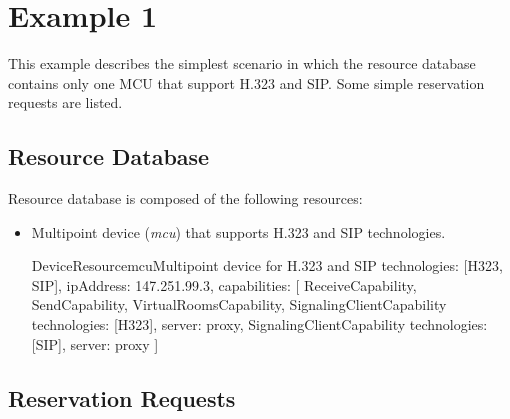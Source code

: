 \section{Example 1}

This example describes the simplest scenario in which the resource database contains only one MCU that support H.323 and SIP. Some simple reservation requests are listed.

\subsection{Resource Database}

Resource database is composed of the following resources:
\begin{itemize}

\item Multipoint device (\emph{mcu}) that supports H.323 and SIP 
  technologies.
  
\begin{EntityExample}{DeviceResource}{mcu}{Multipoint device for H.323 and SIP}
technologies: [H323, SIP], 
ipAddress: 147.251.99.3,
capabilities: [
  ReceiveCapability, SendCapability,
  VirtualRoomsCapability,
  SignalingClientCapability {technologies: [H323], server: proxy},
  SignalingClientCapability {technologies: [SIP], server: proxy}
]
\end{EntityExample}

\end{itemize}

\subsection{Reservation Requests}

